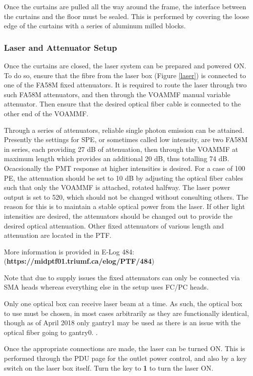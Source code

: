 \documentclass[twoside,letterpaper]{refart}
\begin{document}
Once the curtains are pulled all the way around the frame, the interface between the curtains and the floor must be sealed.  This is performed by covering the loose edge of the curtains with a series of aluminum milled blocks. 

\subsubsection{Laser and Attenuator Setup}

Once the curtains are closed, the laser system can be prepared and powered ON.  To do so, ensure that the fibre from the laser box (Figure \ref{laser}) is connected to one of the FA58M fixed attenuators. It is required to route the laser through two such FA58M attenuators, and then through the VOAMMF manual variable attenuator. Then ensure that the desired optical fiber cable is connected to the other end of the VOAMMF.

Through a series of attenuators, reliable single photon emission can be attained. Presently the settings for SPE, or sometimes called low intensity, are two FA58M in series, each providing 27 dB of attenuation, then through the VOAMMF at maximum length which provides an additional 20 dB, thus totalling 74 dB. Ocacsionally the PMT response at higher intensities is desired. For a case of 100 PE, the attenuation should be set to 10 dB by adjusting the optical fiber cables such that only the VOAMMF is attached, rotated halfway. The laser power output is set to 520, which should not be changed without consulting others. The reason for this is to maintain a stable optical power from the laser. If other light intensities are desired, the attenuators should be changed out to provide the desired optical attenuation. Other fixed attenuators of various length and attenuation are located in the PTF. 

More information is provided in E-Log 484: (\textbf{https://midptf01.triumf.ca/elog/PTF/484})

Note that due to supply issues the fixed attenuators can only be connected via SMA heads whereas everything else in the setup uses FC/PC heads. 

Only one optical box can receive laser beam at a time.  As such, the optical box to use must be chosen, in most cases arbitrarily as they are functionally identical, though as of April 2018 only gantry1 may be used as there is an issue with the optical fiber going to gantry0. .

Once the appropriate connections are made, the laser can be turned ON. This is performed through the PDU page for the outlet power control, and also by a key switch on the laser box itself.  Turn the key to \textbf{1} to turn the laser ON. 
\end{document}
